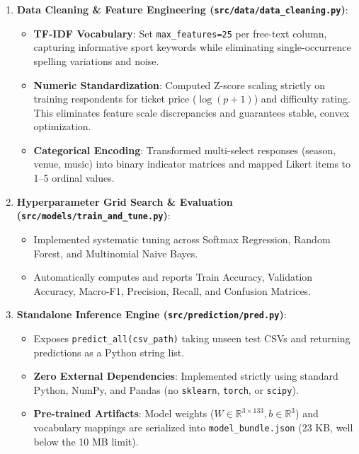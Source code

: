 \documentclass[11pt,a4paper]{article}
\begin{document}
\begin{enumerate}
    \item \textbf{Data Cleaning \& Feature Engineering (\texttt{src/data/data\_cleaning.py})}:
    \begin{itemize}
        \item \textbf{TF-IDF Vocabulary}: Set \texttt{max\_features=25} per free-text column, capturing informative sport keywords while eliminating single-occurrence spelling variations and noise.
        \item \textbf{Numeric Standardization}: Computed Z-score scaling strictly on training respondents for ticket price ($\log(p+1)$) and difficulty rating. This eliminates feature scale discrepancies and guarantees stable, convex optimization.
        \item \textbf{Categorical Encoding}: Transformed multi-select responses (season, venue, music) into binary indicator matrices and mapped Likert items to 1--5 ordinal values.
    \end{itemize}
    \item \textbf{Hyperparameter Grid Search \& Evaluation (\texttt{src/models/train\_and\_tune.py})}:
    \begin{itemize}
        \item Implemented systematic tuning across Softmax Regression, Random Forest, and Multinomial Naive Bayes.
        \item Automatically computes and reports Train Accuracy, Validation Accuracy, Macro-F1, Precision, Recall, and Confusion Matrices.
    \end{itemize}
    \item \textbf{Standalone Inference Engine (\texttt{src/prediction/pred.py})}:
    \begin{itemize}
        \item Exposes \texttt{predict\_all(csv\_path)} taking unseen test CSVs and returning predictions as a Python string list.
        \item \textbf{Zero External Dependencies}: Implemented strictly using standard Python, NumPy, and Pandas (no \texttt{sklearn}, \texttt{torch}, or \texttt{scipy}).
        \item \textbf{Pre-trained Artifacts}: Model weights ($W \in \mathbb{R}^{3 \times 133}, b \in \mathbb{R}^3$) and vocabulary mappings are serialized into \texttt{model\_bundle.json} (23 KB, well below the 10 MB limit).
    \end{itemize}
\end{enumerate}
\end{document}

